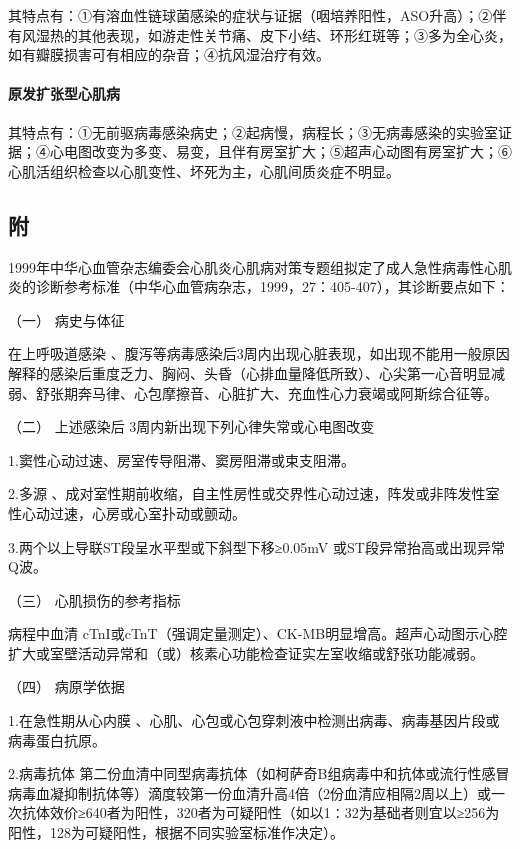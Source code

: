 其特点有：①有溶血性链球菌感染的症状与证据（咽培养阳性，ASO升高）；②伴有风湿热的其他表现，如游走性关节痛、皮下小结、环形红斑等；③多为全心炎，如有瓣膜损害可有相应的杂音；④抗风湿治疗有效。

\paragraph{原发扩张型心肌病}

其特点有：①无前驱病毒感染病史；②起病慢，病程长；③无病毒感染的实验室证据；④心电图改变为多变、易变，且伴有房室扩大；⑤超声心动图有房室扩大；⑥心肌活组织检查以心肌变性、坏死为主，心肌间质炎症不明显。

\subsection{附}

1999年中华心血管杂志编委会心肌炎心肌病对策专题组拟定了成人急性病毒性心肌炎的诊断参考标准（中华心血管病杂志，1999，27：405-407），其诊断要点如下：

\hypertarget{text00304.htmlux5cux23CHP10-5-3-1}{}
（一） 病史与体征

在上呼吸道感染
、腹泻等病毒感染后3周内出现心脏表现，如出现不能用一般原因解释的感染后重度乏力、胸闷、头昏（心排血量降低所致）、心尖第一心音明显减弱、舒张期奔马律、心包摩擦音、心脏扩大、充血性心力衰竭或阿斯综合征等。

\hypertarget{text00304.htmlux5cux23CHP10-5-3-2}{}
（二） 上述感染后 3周内新出现下列心律失常或心电图改变

1.窦性心动过速、房室传导阻滞、窦房阻滞或束支阻滞。

2.多源
、成对室性期前收缩，自主性房性或交界性心动过速，阵发或非阵发性室性心动过速，心房或心室扑动或颤动。

3.两个以上导联ST段呈水平型或下斜型下移≥0.05mV
或ST段异常抬高或出现异常Q波。

\hypertarget{text00304.htmlux5cux23CHP10-5-3-3}{}
（三） 心肌损伤的参考指标

病程中血清
cTnI或cTnT（强调定量测定）、CK-MB明显增高。超声心动图示心腔扩大或室壁活动异常和（或）核素心功能检查证实左室收缩或舒张功能减弱。

\hypertarget{text00304.htmlux5cux23CHP10-5-3-4}{}
（四） 病原学依据

1.在急性期从心内膜
、心肌、心包或心包穿刺液中检测出病毒、病毒基因片段或病毒蛋白抗原。

2.病毒抗体
第二份血清中同型病毒抗体（如柯萨奇B组病毒中和抗体或流行性感冒病毒血凝抑制抗体等）滴度较第一份血清升高4倍（2份血清应相隔2周以上）或一次抗体效价≥640者为阳性，320者为可疑阳性（如以1∶32为基础者则宜以≥256为阳性，128为可疑阳性，根据不同实验室标准作决定）。

